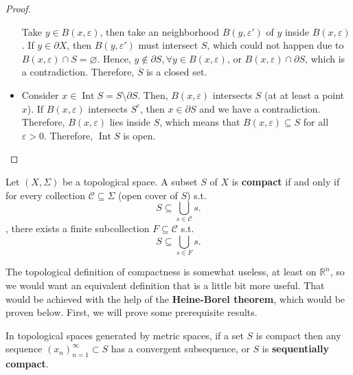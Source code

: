 \begin{proof}
\begin{itemize}
    Take \( y \in B(x, \varepsilon) \), then take an neighborhood \( B(y,
    \varepsilon') \) of \( y \) inside \( B(x, \varepsilon) \). If \( y \in \partial
    X\), then \( B(y, \varepsilon') \) must intersect \( S \), which could not
    happen due to \( B(x, \varepsilon) \cap  S = \varnothing \). Hence, \( y
    \notin \partial S, \forall y \in B(x, \varepsilon) \), or \( B(x,
    \varepsilon) \cap  \partial S \), which is a contradiction. Therefore, \(
    \overline{S} \) is a closed set.

  \item Consider \( x \in \operatorname{Int} S = S \setminus \partial S \).
    Then, \( B(x, \varepsilon) \) intersects \( S \) (at at least a point \( x
    \)). If \( B(x, \varepsilon) \) intersects \( S^{c} \), then \( x \in
    \partial S \) and we have a contradiction. Therefore, \( B(x, \varepsilon)
    \) lies inside \( S \), which means that \( B(x, \varepsilon) \subseteq S \)
    for all \( \varepsilon > 0 \). Therefore, \( \operatorname{Int} S \) is
    open.
\end{itemize}
\end{proof}

\begin{definition}
  Let \( (X, \Sigma) \) be a topological space. A subset \( S \) of \( X \) is
  \textbf{compact} if and only if for every collection \( \mathcal{C} \subseteq
  \Sigma \) (open cover of \( S \)) s.t.\[
    S \subseteq  \bigcup_{s \in \mathcal{C}} s
  .\] , there exists a finite subcollection \( F
  \subseteq \mathcal{C} \) s.t. \[
    S \subseteq  \bigcup_{s \in F} s
  .\] 
\end{definition}

The topological definition of compactness is somewhat useless, at least on \(
\mathbb{R}^{n} \), so we would want an equivalent definition that is a little
bit more useful. That would be achieved with the help of the \textbf{Heine-Borel
theorem}, which would be proven below. First, we will prove some prerequisite
results.

\begin{theorem}
  In topological spaces generated by metric spaces, if a set \( S \) is compact
  then any sequence \( (x_n)_{n=1}^{\infty} \subset S \) has a convergent
  subsequence, or \( S \) is \textbf{sequentially compact}.
\end{theorem}

